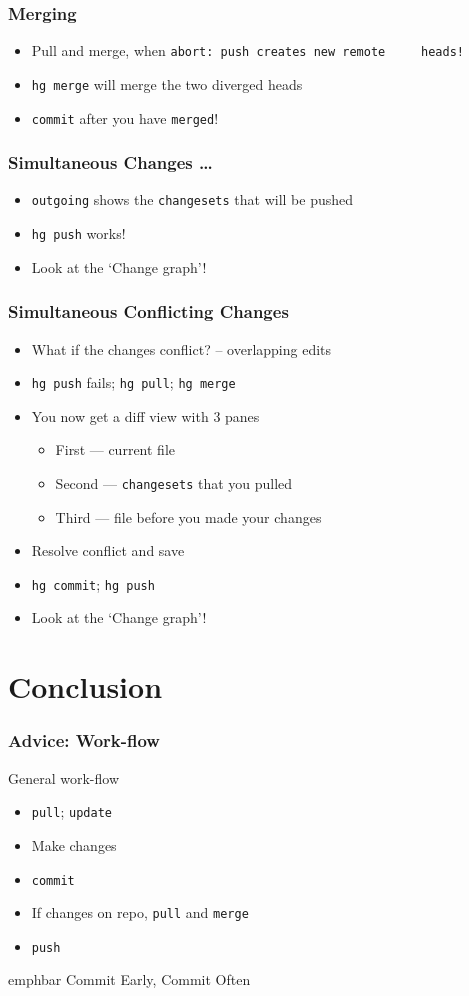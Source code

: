 \documentclass[14pt,compress]{beamer}
\newcommand{\emphbar}[1]
{\begin{beamercolorbox}[rounded=true]{emphbar}
      {#1}
 \end{beamercolorbox}
}
\newcommand{\typ}[1]{\lstinline{#1}}
\begin{document}
\begin{frame}
  \frametitle{Merging}
  \begin{itemize}
  \item Pull and merge, when \typ{abort: push creates new remote
    heads!}
  \item \typ{hg merge} will merge the two diverged heads
  \item \typ{commit} after you have \typ{merged}!
  \end{itemize}
\end{frame}

\begin{frame}
  \frametitle{Simultaneous Changes \ldots}
  \begin{itemize}
  \item \typ{outgoing} shows the \typ{changesets} that will be pushed
  \item \typ{hg push} works!
  \item Look at the `Change graph'!
  \end{itemize}
\end{frame}

\begin{frame}
  \frametitle{Simultaneous Conflicting Changes}
  \begin{itemize}
  \item What if the changes conflict? -- overlapping edits
  \item \typ{hg push} fails; \typ{hg pull}; \typ{hg merge}
  \item You now get a diff view with 3 panes
    \begin{itemize}
    \item First --- current file
    \item Second --- \typ{changesets} that you pulled
    \item Third --- file before you made your changes
    \end{itemize}
  \item Resolve conflict and save
  \item \typ{hg commit}; \typ{hg push}
  \item Look at the `Change graph'!
  \end{itemize}
\end{frame}

\section{Conclusion}

\begin{frame}
  \frametitle{\alert{Advice}: Work-flow}
  General work-flow
  \begin{itemize}
  \item \typ{pull}; \typ{update}
  \item Make changes
  \item \typ{commit}
  \item If changes on repo, \typ{pull} and \typ{merge}
  \item \typ{push}
  \end{itemize}
  \emphbar{Commit Early, Commit Often}
\end{frame}
\end{document}
